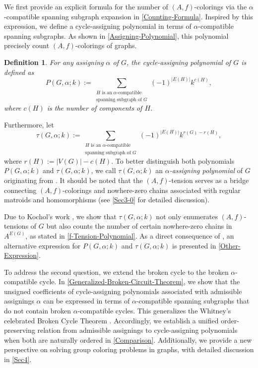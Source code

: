 \documentclass[12pt]{article}%
\numberwithin{equation}{section}
\newtheorem{definition}[definition]{Definition}
\begin{document}
We first provide an explicit formula for the number of $(A,f)$-colorings via the $\alpha$-compatible spanning subgraph expansion in \autoref{Counting-Formula}. Inspired by this expression, we define a cycle-assigning polynomial in terms of $\alpha$-compatible spanning subgraphs. As shown in \autoref{Assigning-Polynomial}, this polynomial  precisely count $(A,f)$-colorings of graphs. 
\begin{definition}
{\rm For any assigning $\alpha$ of $G$, the {\em cycle-assigning polynomial} of $G$ is defined as 
\[
P(G,\alpha;k):=\sum_{\substack{\mbox{$H$ is an $\alpha$-compatible}\\ \mbox{spanning subgraph of $G$}}}(-1)^{|E(H)|}k^{c(H)},
\] 
where $c(H)$ is the number of components of $H$. }
\end{definition}
Furthermore, let
\[
\tau(G,\alpha;k):=\sum_{\substack{\mbox{$H$ is an $\alpha$-compatible}\\ \mbox{spanning subgraph of $G$}}}(-1)^{|E(H)|}k^{r(G)-r(H)},
\]
where $r(H):=|V(G)|-c(H)$. To better distinguish both polynomials $P(G,\alpha;k)$ and $\tau(G,\alpha;k)$, we call  $\tau(G,\alpha;k)$ an {\em $\alpha$-assigning polynomial} of $G$ originating from  \cite{Kochol2022,Kochol2024}. It should be noted that the $(A,f)$-tension serves as a bridge connecting $(A,f)$-colorings and nowhere-zero chains associated with regular matroids and homomorphisms (see \autoref{Sec3-0} for detailed discussion).

Due to Kochol's work \cite{Kochol2022,Kochol2024}, we show that $\tau(G,\alpha;k)$ not only enumerates $(A,f)$-tensions of $G$ but also counts the number of certain nowhere-zero chains in $A^{E(G)}$, as stated in \autoref{f-Tension-Polynomial}. As a direct consequence of \cite[Theorem 2]{Kochol2024}, an alternative expression for $P(G,\alpha;k)$ and $\tau(G,\alpha;k)$ is presented in \autoref{Other-Expression}.

To address the second question, we extend the broken cycle \cite{Whitney1932} to the broken $\alpha$-compatible cycle. In \autoref{Generalized-Broken-Circuit-Theorem}, we  show that the unsigned coefficients of cycle-assigning polynomials associated with admissible assignings $\alpha$ can be expressed in terms of $\alpha$-compatible spanning subgraphs that do not contain  broken $\alpha$-compatible cycles. This generalizes the Whitney's celebrated Broken Cycle Theorem \cite{Whitney1932}. Accordingly, we establish a unified order-preserving relation from admissible assignings to cycle-assigning polynomials when both are naturally ordered in \autoref{Comparison}. Additionally, we provide a new perspective on solving group coloring problems in graphs, with detailed discussion in \autoref{Sec4}.
\end{document}
